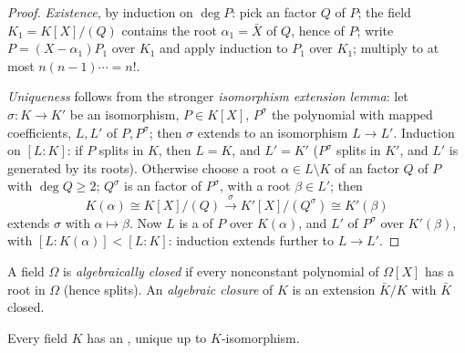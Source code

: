 \begin{proof}
\emph{Existence}, by induction on $\deg P$: pick an 
factor $Q$ of $P$; the field $K_1 = K[X]/(Q)$ contains the root
$\alpha_1 = \bar X$ of $Q$, hence of $P$; write $P = (X -
\alpha_1)P_1$ over $K_1$ and apply induction to $P_1$ over $K_1$;
 multiply to at most $n(n-1)\cdots = n!$.

\emph{Uniqueness} follows from the stronger \emph{isomorphism
extension lemma}: let $\sigma \colon K \to K'$ be an isomorphism,
$P \in K[X]$, $P^\sigma$ the polynomial with mapped coefficients,
$L, L'$  of $P, P^\sigma$; then $\sigma$ extends
to an isomorphism $L \to L'$. Induction on $[L:K]$: if $P$ splits
in $K$, then $L = K$, and $L' = K'$ ($P^\sigma$ splits in $K'$,
and $L'$ is generated by its roots). Otherwise choose a root
$\alpha \in L \setminus K$ of an  factor $Q$ of $P$
with $\deg Q \geq 2$; $Q^\sigma$ is an  factor of
$P^\sigma$, with a root $\beta \in L'$; then
\[
K(\alpha) \cong K[X]/(Q) \xrightarrow{\ \sigma\ }
K'[X]/(Q^\sigma) \cong K'(\beta)
\]
extends $\sigma$ with $\alpha \mapsto \beta$. Now $L$ is a
 of $P$ over $K(\alpha)$, and $L'$ of $P^\sigma$
over $K'(\beta)$, with $[L : K(\alpha)] < [L:K]$: induction
extends further to $L \to L'$.
\end{proof}

\begin{definition}\label{def:b3:galois:closure}
A field $\Omega$ is \emph{algebraically closed} if every nonconstant polynomial of $\Omega[X]$ has
a root in $\Omega$ (hence splits). An \emph{algebraic
closure} of $K$ is an 
extension $\bar K/K$ with $\bar K$  closed.
\end{definition}

\begin{theorem}[Steinitz]\label{thm:b3:galois:steinitz}
Every field $K$ has an , unique up to
$K$-isomorphism.
\end{theorem}

